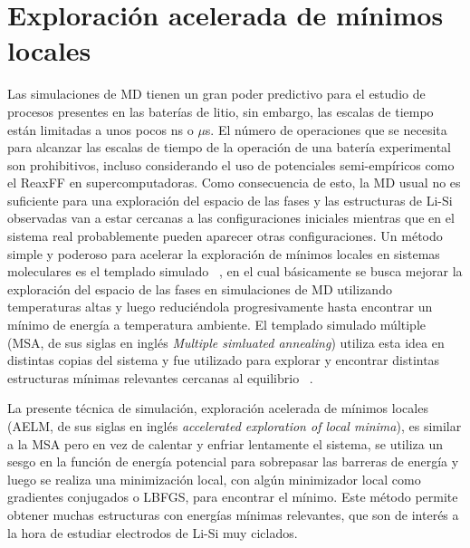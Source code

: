 \section{Exploración acelerada de mínimos locales}

Las simulaciones de MD tienen un gran poder predictivo para el estudio de 
procesos presentes en las baterías de litio, sin embargo, las escalas de tiempo
están limitadas a unos pocos ns o $\mu$s. El número de operaciones que se 
necesita para alcanzar las escalas de tiempo de la operación de una batería 
experimental son prohibitivos, incluso considerando el uso de potenciales 
semi-empíricos como el ReaxFF en supercomputadoras. Como consecuencia de esto,
la MD usual no es suficiente para una exploración del espacio de las fases y las
estructuras de Li-Si observadas van a estar cercanas a las configuraciones 
iniciales mientras que en el sistema real probablemente pueden aparecer otras
configuraciones. Un método simple y poderoso para acelerar la exploración de 
mínimos locales en sistemas moleculares es el templado simulado 
~\cite{kirkpatrick1983}, en el cual básicamente se busca mejorar la exploración
del espacio de las fases en simulaciones de MD utilizando temperaturas altas y
luego reduciéndola progresivamente hasta encontrar un mínimo de energía a 
temperatura ambiente. El templado simulado múltiple (MSA, de sus siglas en inglés 
\textit{Multiple simluated annealing}) utiliza esta idea en distintas copias del 
sistema y fue utilizado para explorar y encontrar distintas estructuras mínimas 
relevantes cercanas al equilibrio ~\cite{hao2015}.

La presente técnica de simulación, exploración acelerada de mínimos locales (AELM,
de sus siglas en inglés \textit{accelerated exploration of local minima}), es 
similar a la MSA pero en vez de calentar y enfriar lentamente el sistema, se 
utiliza un sesgo en la función de energía potencial para sobrepasar las barreras
de energía y luego se realiza una minimización local, con algún minimizador local 
como gradientes conjugados o LBFGS, para encontrar el mínimo. Este método permite 
obtener muchas estructuras con energías mínimas relevantes, que son de interés a 
la hora de estudiar electrodos de Li-Si muy ciclados.

